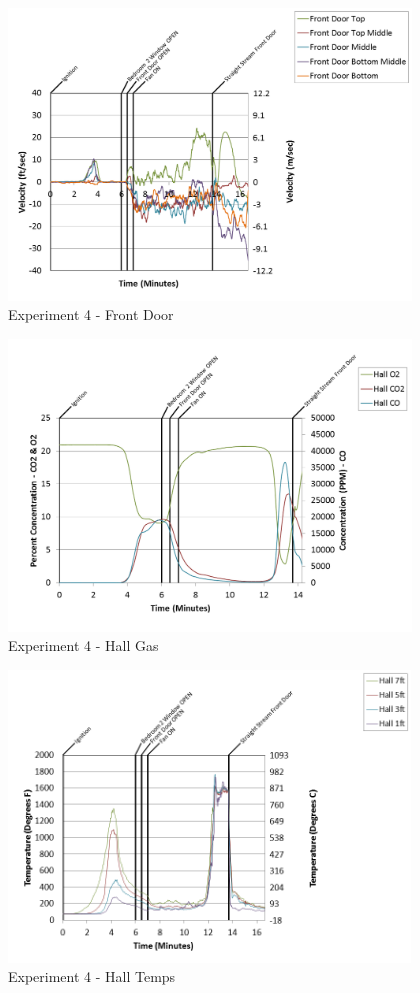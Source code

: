 \documentclass{article}
\begin{document}
\begin{appendices}
\begin{figure}[h!]
	\centering
	\includegraphics[height=3.05in]{0_Images/Results_Charts/Exp_4_Charts/FrontDoor.png}
	\caption{Experiment 4 - Front Door}
\end{figure}

\clearpage

\begin{figure}[h!]
	\centering
	\includegraphics[height=3.05in]{0_Images/Results_Charts/Exp_4_Charts/HallGas.png}
	\caption{Experiment 4 - Hall Gas}
\end{figure}


\begin{figure}[h!]
	\centering
	\includegraphics[height=3.05in]{0_Images/Results_Charts/Exp_4_Charts/HallTemps.png}
	\caption{Experiment 4 - Hall Temps}
\end{figure}


\end{appendices}
\end{document}
